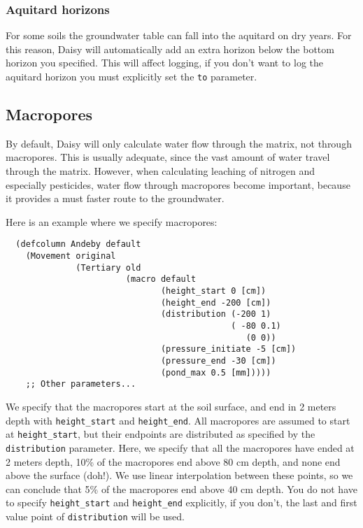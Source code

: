 \documentclass[a4paper]{article}
\begin{document}
\subsubsection{Aquitard horizons}
\label{sec:aquitard}

For some soils the groundwater table can fall into the aquitard on dry
years.  For this reason, Daisy will automatically add an extra
horizon below the bottom horizon you specified.  This will affect
logging, if you don't want to log the aquitard horizon you must
explicitly set the \texttt{to} parameter.

\subsection{Macropores}
\label{sec:macro}

By default, Daisy will only calculate water flow through the
matrix, not through macropores.  This is usually adequate, since the
vast amount of water travel through the matrix.  However, when
calculating leaching of nitrogen and especially pesticides, water flow
through macropores become important, because it provides a must faster
route to the groundwater.

Here is an example where we specify macropores:
\begin{verbatim}
  (defcolumn Andeby default
    (Movement original 
              (Tertiary old
                        (macro default
                               (height_start 0 [cm])
                               (height_end -200 [cm])
                               (distribution (-200 1) 
                                             ( -80 0.1) 
                                                (0 0))
                               (pressure_initiate -5 [cm])
                               (pressure_end -30 [cm])
                               (pond_max 0.5 [mm]))))
    ;; Other parameters...
\end{verbatim}

We specify that the macropores start at the soil surface, and end in 2
meters depth with \texttt{height\_start} and \texttt{height\_end}.  All
macropores are assumed to start at \texttt{height\_start}, but their
endpoints are distributed as specified by the \texttt{distribution}
parameter.  Here, we specify that all the macropores have ended at 2
meters depth, 10\% of the macropores end above 80 cm depth, and none
end above the surface (doh!).  We use linear interpolation between
these points, so we can conclude that 5\% of the macropores end above
40 cm depth.  You do not have to specify \texttt{height\_start} and
\texttt{height\_end} explicitly, if you don't, the last and first
value point of \texttt{distribution} will be used.
\end{document}

